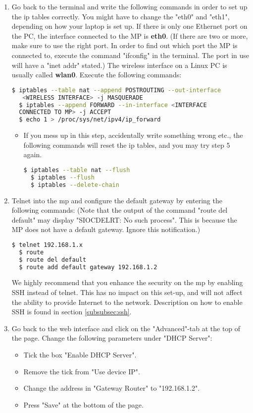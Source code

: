 \begin{enumerate}
\item Go back to the terminal and write the following commands in order to set up the ip tables correctly. You might have to change the "eth0" and "eth1", depending on how your laptop is set up. If there is only one Ethernet port on the PC, the interface connected to the MP is \textbf{eth0}. (If there are two or more, make sure to use the right port. In order to find out which port the MP is connected to, execute the command "ifconfig" in the terminal. The port in use will have a "inet addr" stated.) The wireless interface on a Linux PC is usually called \textbf{wlan0}. Execute the following commands: 
\noindent
\begin{lstlisting}[language=bash]
  $ iptables --table nat --append POSTROUTING --out-interface
   <WIRELESS INTERFACE> -j MASQUERADE
  $ iptables --append FORWARD --in-interface <INTERFACE 
  CONNECTED TO MP> -j ACCEPT
  $ echo 1 > /proc/sys/net/ipv4/ip_forward
\end{lstlisting} 
\begin{itemize}
\item If you mess up in this step, accidentally write something wrong etc., the following commands will reset the ip tables, and you may try step 5 again.
\noindent
\begin{lstlisting}[language=bash]
  $ iptables --table nat --flush
  $ iptables --flush
  $ iptables --delete-chain
\end{lstlisting}
\end{itemize}  

\item Telnet into the \gls{mp} and configure the default gateway by entering the following commands: (Note that the output of the command "route del default" may display "SIOCDELRT: No such process". This is because the MP does not have a default gateway. Ignore this notification.)
\begin{lstlisting}[language=bash]
  $ telnet 192.168.1.x
  $ route 
  $ route del default 
  $ route add default gateway 192.168.1.2
\end{lstlisting} 

We highly recommend that you enhance the security on the \gls{mp} by enabling SSH instead of telnet. This has no impact on this set-up, and will not affect the ability to provide Internet to the network. Description on how to enable SSH is found in section \ref{subsubsec:ssh}.

\item Go back to the web interface and click on the "Advanced"-tab at the top of the page. Change the following parameters under "DHCP Server":
\begin{itemize}
\item Tick the box "Enable DHCP Server".
\item Remove the tick from "Use device IP".
\item Change the address in "Gateway Router" to "192.168.1.2".
\item Press "Save" at the bottom of the page. 
\end{itemize}


\end{enumerate}
